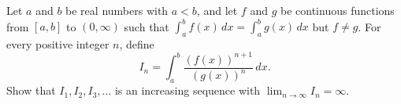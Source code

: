 Let $a$ and $b$ be real numbers with $a<b$, and let $f$ and $g$ be continuous functions from $[a,b]$ to $(0, \infty)$
such that $\int_a^b f(x)\,dx = \int_a^b g(x)\,dx$ but $f \neq g$. For every positive integer $n$, define
\[
I_n = \int_a^b \frac{(f(x))^{n+1}}{(g(x))^n}\,dx.
\]
Show that $I_1, I_2, I_3, \dots$ is an increasing sequence with $\lim_{n \to \infty} I_n = \infty$.
